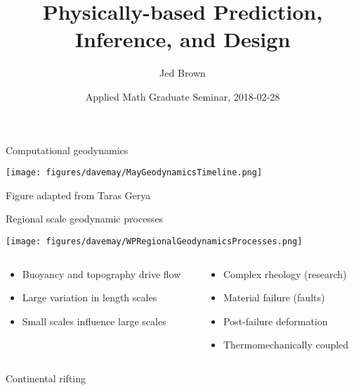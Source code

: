 \documentclass[aspectratio=169]{beamer}
\title{Physically-based Prediction, Inference, and Design}
\author{Jed Brown}
\date{Applied Math Graduate Seminar, 2018-02-28}
\begin{document}
\lstset{language=C}
\normalem




\begin{frame}{Computational geodynamics}
  \begin{center}
    \texttt{[image: figures/davemay/MayGeodynamicsTimeline.png]}
  \end{center}
  \vspace{-1ex}
  {\scriptsize Figure adapted from Taras Gerya}
\end{frame}

\begin{frame}{Regional scale geodynamic processes}
  \begin{center}
    \texttt{[image: figures/davemay/WPRegionalGeodynamicsProcesses.png]}
  \end{center}
  \begin{columns}
    \begin{column}{0.5\textwidth}
      \begin{itemize}
      \item Buoyancy and topography drive flow
      \item Large variation in length scales
      \item Small scales influence large scales
      \end{itemize}
    \end{column}
    \begin{column}{0.5\textwidth}
      \begin{itemize}
      \item Complex rheology (research)
      \item Material failure (faults)
      \item Post-failure deformation
      \item Thermomechanically coupled
      \end{itemize}
    \end{column}
  \end{columns}
\end{frame}
\begin{frame}{Continental rifting}
  \begin{center}
  \end{center}
\end{frame}
\end{document}
